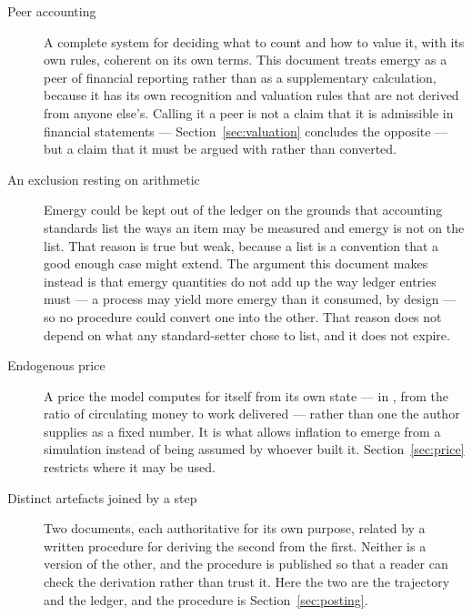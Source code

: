 \documentclass[11pt,a4paper]{article}
\begin{document}
\begin{description}
\item[Peer accounting] A complete system for deciding what to count and how to value it, with its own rules, coherent on its own terms. This document treats emergy as a peer of financial reporting rather than as a supplementary calculation, because it has its own recognition and valuation rules that are not derived from anyone else's. Calling it a peer is not a claim that it is admissible in financial statements --- Section~\ref{sec:valuation} concludes the opposite --- but a claim that it must be argued with rather than converted.
\item[An exclusion resting on arithmetic] Emergy could be kept out of the ledger on the grounds that accounting standards list the ways an item may be measured and emergy is not on the list. That reason is true but weak, because a list is a convention that a good enough case might extend. The argument this document makes instead is that emergy quantities do not add up the way ledger entries must --- a process may yield more emergy than it consumed, by design --- so no procedure could convert one into the other. That reason does not depend on what any standard-setter chose to list, and it does not expire.
\item[Endogenous price] A price the model computes for itself from its own state --- in \gssk{}, from the ratio of circulating money to work delivered --- rather than one the author supplies as a fixed number. It is what allows inflation to emerge from a simulation instead of being assumed by whoever built it. Section~\ref{sec:price} restricts where it may be used.
\item[Distinct artefacts joined by a step] Two documents, each authoritative for its own purpose, related by a written procedure for deriving the second from the first. Neither is a version of the other, and the procedure is published so that a reader can check the derivation rather than trust it. Here the two are the trajectory and the ledger, and the procedure is Section~\ref{sec:posting}.
\end{description}


% 
% 
\end{document}
